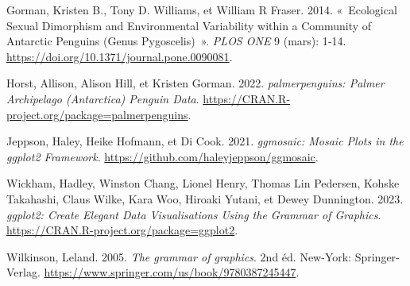 \documentclass[
  a4paper,
  DIV=11,
  numbers=noendperiod,
  oneside]{scrreprt}
\newlength{\cslhangindent}
\newenvironment{CSLReferences}[2] %
 {\begin{list}{}{%
  \setlength{\itemindent}{0pt}
  \setlength{\leftmargin}{0pt}
  \setlength{\parsep}{0pt}
  \ifodd #1
   \setlength{\leftmargin}{\cslhangindent}
   \setlength{\itemindent}{-1\cslhangindent}
  \fi
  \setlength{\itemsep}{#2\baselineskip}}}
 {\end{list}}
\begin{document}
\label{refs}
\begin{CSLReferences}{1}{0}
Gorman, Kristen B., Tony D. Williams, et William R Fraser. 2014.
{«~Ecological Sexual Dimorphism and Environmental Variability within a
Community of Antarctic Penguins (Genus Pygoscelis)~»}. \emph{PLOS ONE} 9
(mars): 1‑14. \url{https://doi.org/10.1371/journal.pone.0090081}.

Horst, Allison, Alison Hill, et Kristen Gorman. 2022.
\emph{palmerpenguins: Palmer Archipelago (Antarctica) Penguin Data}.
\url{https://CRAN.R-project.org/package=palmerpenguins}.

Jeppson, Haley, Heike Hofmann, et Di Cook. 2021. \emph{ggmosaic: Mosaic
Plots in the ggplot2 Framework}.
\url{https://github.com/haleyjeppson/ggmosaic}.

Wickham, Hadley, Winston Chang, Lionel Henry, Thomas Lin Pedersen,
Kohske Takahashi, Claus Wilke, Kara Woo, Hiroaki Yutani, et Dewey
Dunnington. 2023. \emph{ggplot2: Create Elegant Data Visualisations
Using the Grammar of Graphics}.
\url{https://CRAN.R-project.org/package=ggplot2}.

Wilkinson, Leland. 2005. \emph{The grammar of graphics}. 2nd éd.
New-York: Springer-Verlag.
\url{https://www.springer.com/us/book/9780387245447}.

\end{CSLReferences}
\end{document}
